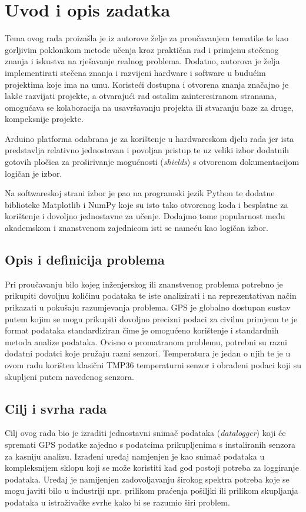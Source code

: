 \chapter{Uvod i opis zadatka}\label{OpisIOgranicenja}
Tema ovog rada proizašla je iz autorove želje za proučavanjem tematike te kao gorljivim poklonikom metode učenja kroz praktičan rad i primjenu stečenog znanja i iskustva na rješavanje realnog problema.
Dodatno, autorova je želja implementirati stečena znanja i razvijeni hardware i software u budućim projektima koje ima na umu.
Koristeći dostupna i otvorena znanja značajno je lakše razvijati projekte, a otvarajući rad ostalim zainteresiranom stranama, omogućava se kolaboracija na usavršavanju projekta ili stvaranju baze za druge, kompeksnije projekte.

Arduino platforma odabrana je za korištenje u hardwareskom djelu rada jer ista predstavlja relativno jednostavan i povoljan pristup te uz veliki izbor dodatnih gotovih pločica za proširivanje mogućnosti (\textit{shields}) s otvorenom dokumentacijom logičan je izbor.

Na softwareskoj strani izbor je pao na programski jezik Python te dodatne biblioteke Matplotlib i NumPy koje su isto tako otvorenog koda i besplatne za korištenje i dovoljno jednostavne za učenje.
Dodajmo tome popularnost među akademskom i znanstvenom zajednicom isti se nameću kao logičan izbor.

\section{Opis i definicija problema}
Pri proučavanju bilo kojeg inženjerskog ili znanstvenog problema potrebno je prikupiti dovoljnu količinu podataka te iste analizirati i na reprezentativan način prikazati u pokušaju razumjevanja problema.
GPS je globalno dostupan sustav putem kojim se mogu prikupiti dovoljno precizni podaci za civilnu primjenu te je format podataka standardiziran čime je omogućeno korištenje i standardnih metoda analize podataka.
Ovisno o promatranom problemu, potrebni su razni dodatni podatci koje pružaju razni senzori.
Temperatura je jedan o njih te je u ovom radu korišten klasični TMP36 temperaturni senzor i obrađeni podaci koji su skupljeni putem navedenog senzora.

\section{Cilj i svrha rada}
Cilj ovog rada bio je izraditi jednostavni snimač podataka (\textit{datalogger}) koji će spremati GPS podatke zajedno s podatcima prikupljenima s instaliranih senzora za kasniju analizu.
Izrađeni uređaj namjenjen je kao snimač podataka u kompleksnijem sklopu koji se može koristiti kad god postoji potreba za loggiranje podataka.
Uređaj je namijenjen zadovoljavanju širokog spektra potreba koje se mogu javiti bilo u industriji npr. prilikom praćenja pošiljki ili prilikom skupljanja podataka u istraživačke svrhe kako bi se razumio širi problem.

